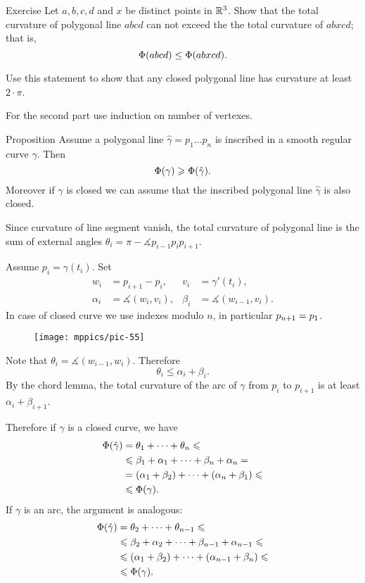 \begin{thm}{Exercise}\label{ex:monotonic-tc}
Let $a,b,c,d$ and $x$ be distinct points in $\mathbb{R}^3$.
Show that the total curvature of polygonal line $abcd$ can not exceed the the total curvature of $abxcd$; that is, 
\[\Phi({abcd}) \leq \Phi({abxcd}).\]

Use this statement to show that any closed polygonal line has curvature at least $2\cdot\pi$.
\end{thm}

 For the second part use induction on number of vertexes.

\begin{thm}{Proposition}\label{prop:inscribed-total-curvature}
Assume a polygonal line $\hat\gamma=p_1\dots p_n$ is inscribed in a smooth regular curve $\gamma$.
Then 
\[\Phi({\gamma})\geqslant \Phi({\hat\gamma}).\]
Moreover if $\gamma$ is closed we can assume that the inscribed polygonal line $\hat\gamma$ is also closed.

\end{thm}

Since curvature of line segment vanish, 
the total curvature of polygonal line is the sum of external angles $\theta_i=\pi-\measuredangle p_{i-1}p_ip_{i+1}$.

Assume $p_i=\gamma(t_i)$.
Set 
\begin{align*}
w_i&=p_{i+1}-p_i,& v_i&=\gamma'(t_i),
\\
\alpha_i&=\measuredangle (w_i,v_i),&\beta_i&=\measuredangle (w_{i-1},v_i).
\end{align*}
In case of closed curve we use indexes modulo $n$, in particular $p_{n+1}\z=p_1$.

\begin{wrapfigure}{r}{45 mm}
\vskip-7mm
\centering
\texttt{[image: mppics/pic-55]}
\vskip0mm
\end{wrapfigure}

Note that $\theta_i=\measuredangle (w_{i-1},w_i)$.
Therefore 
\[\theta_i\le \alpha_i+\beta_i.\]
By the chord lemma, the total curvature of the arc of $\gamma$ from $p_i$ to $p_{i+1}$ is at least $\alpha_i+\beta_{i+1}$. 

Therefore if $\gamma$ is a closed curve, we have
\begin{align*}
\Phi({\hat\gamma})&=\theta_1+\dots+\theta_n\leqslant 
\\
&\leqslant\beta_1+\alpha_1+\dots+\beta_n+\alpha_n = 
\\
&=(\alpha_1+\beta_2)+\dots+(\alpha_n+\beta_1) \leqslant 
\\
&\leqslant \Phi({\gamma}).
\end{align*}
If $\gamma$ is an arc, the argument is analogous:
\begin{align*}
\Phi({\hat\gamma})&=\theta_2+\dots+\theta_{n-1}\leqslant 
\\
&\leqslant\beta_2+\alpha_2+\dots+\beta_{n-1}+\alpha_{n-1} \leqslant
\\
&\leqslant (\alpha_1+\beta_2)+\dots+(\alpha_{n-1}+\beta_n) \leqslant 
\\
&\leqslant \Phi({\gamma}).
\end{align*}
\qedsf

